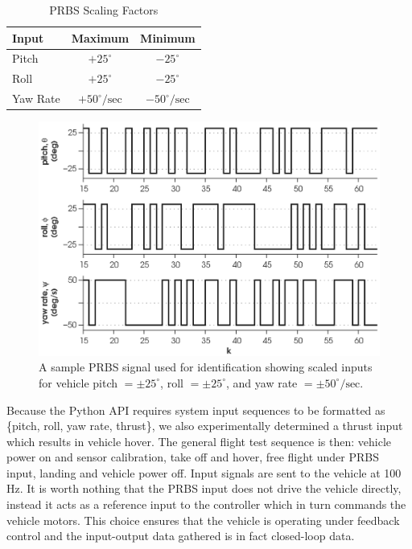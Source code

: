 \begin{table}[!htb]
\centering
\caption{PRBS Scaling Factors}\vspace{1em}
\begin{tabular}{lcc}
\toprule
Input & Maximum & Minimum\\
\midrule
Pitch & $+25^\circ$ & $-25^\circ$\\
Roll & $+25^\circ$ & $-25^\circ$\\
Yaw Rate & $+50^\circ/\mbox{sec}$ & $-50^\circ/\mbox{sec}$\\
\bottomrule
\end{tabular}
\end{table}

\begin{figure}[htb!]
	\centering
	\includegraphics{../fig/test_prbs.eps}
	\caption[A sample PRBS signal used for identification showing scaled inputs for vehicle pitch, roll, and yaw rate.]{A sample PRBS signal used for identification showing scaled inputs for vehicle pitch $= \pm 25^\circ$, roll $= \pm 25^\circ$, and yaw rate $= \pm 50^\circ/\mbox{sec}$.}
\end{figure}

Because the Python API requires system input sequences to be formatted as \{pitch, roll, yaw rate, thrust\}, we also experimentally determined a thrust input which results in vehicle hover. The general flight test sequence is then: vehicle power on and sensor calibration, take off and hover, free flight under PRBS input, landing and vehicle power off. Input signals are sent to the vehicle at 100 Hz. It is worth nothing that the PRBS input does not drive the vehicle directly, instead it acts as a reference input to the controller which in turn commands the vehicle motors. This choice ensures that the vehicle is operating under feedback control and the input-output data gathered is in fact closed-loop data.

